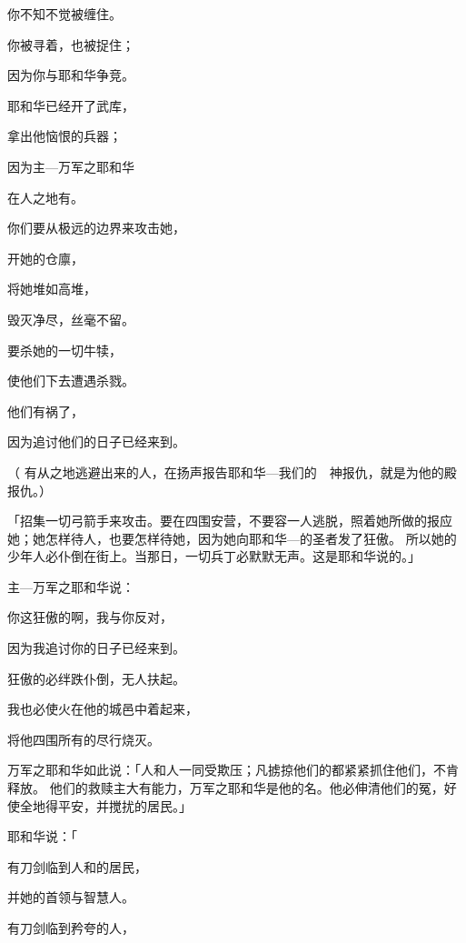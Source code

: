 {\par }{\Q 你不知不觉被缠住。
\par }{\Q 你被寻着，也被捉住；
\par }{\Q 因为你与耶和华争竞。
\par }{\Q {}耶和华已经开了武库，
\par }{\Q 拿出他恼恨的兵器；
\par }{\Q 因为主—万军之耶和华
\par }{\Q 在{}人之地有{}。
\par }{\Q {}你们要从极远的边界来攻击她，
\par }{\Q 开她的仓廪，
\par }{\Q 将她堆如高堆，
\par }{\Q 毁灭净尽，丝毫不留。
\par }{\Q {}要杀她的一切牛犊，
\par }{\Q 使他们下去遭遇杀戮。
\par }{\Q 他们有祸了，
\par }{\Q 因为追讨他们的日子已经来到。
\par }{\PP （
有从{}之地逃避出来的人，在{}扬声报告耶和华—我们的　神报仇，就是为他的殿报仇。）
\par }{\PP {}「招集一切弓箭手来攻击{}。要在{}四围安营，不要容一人逃脱，照着她所做的报应她；她怎样待人，也要怎样待她，因为她向耶和华—{}的圣者发了狂傲。
所以她的少年人必仆倒在街上。当那日，一切兵丁必默默无声。这是耶和华说的。」
\par }{\Q {}主—万军之耶和华说：
\par }{\Q 你这狂傲的啊，我与你反对，
\par }{\Q 因为我追讨你的日子已经来到。
\par }{\Q {}狂傲的必绊跌仆倒，无人扶起。
\par }{\Q 我也必使火在他的城邑中着起来，
\par }{\Q 将他四围所有的尽行烧灭。
\par }{\PP {}万军之耶和华如此说：「{}人和{}人一同受欺压；凡掳掠他们的都紧紧抓住他们，不肯释放。
他们的救赎主大有能力，万军之耶和华是他的名。他必伸清他们的冤，好使全地得平安，并搅扰{}的居民。」
\par }{\Q {}耶和华说：「
\par }{\Q 有刀剑临到{}人和{}的居民，
\par }{\Q 并她的首领与智慧人。
\par }{\Q {}有刀剑临到矜夸的人，
}
